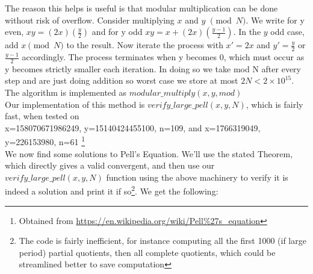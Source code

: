 \documentclass[10pt,a4paper]{report}
\begin{document}
The reason this helps is useful is that modular multiplication can be done without risk of overflow. Consider multiplying $x$ and $y$ $\pmod{N}$. We write for y even, $xy = (2x)(\frac{y}{2})$ and for y odd $xy = x+ (2x)(\frac{y-1}{2})$. In the $y$ odd case, add $x \pmod{N}$ to the result. Now iterate the process with $x'=2x$ and $y'=\frac{y}{2}$ or $\frac{y-1}{2}$ accordingly. The process terminates when y becomes 0, which must occur as y becomes strictly smaller each iteration. In doing so we take mod N after every step and are just doing addition so worst case we store at most $2N < 2\times10^{15}$. The algorithm is implemented as $modular\_multiply(x,y,mod)$\\

Our implementation of this method is $verify\_large\_pell(x,y,N)$, which is fairly fast, when tested on \\ x=158070671986249, y=15140424455100, n=109, and x=1766319049, y=226153980, n=61 \footnote{Obtained from \url{https://en.wikipedia.org/wiki/Pell\%27s_equation}}\\	

We now find some solutions to Pell's Equation. We'll use the stated Theorem, which directly gives a valid convergent, and then use our $verify\_large\_pell(x,y,N)$ function using the above machinery to verify it is indeed a solution and print it if so\footnote{The code is fairly inefficient, for instance computing all the first 1000 (if large period) partial quotients, then all complete quotients, which could be streamlined better to save computation}. We get the following:
\end{document}
